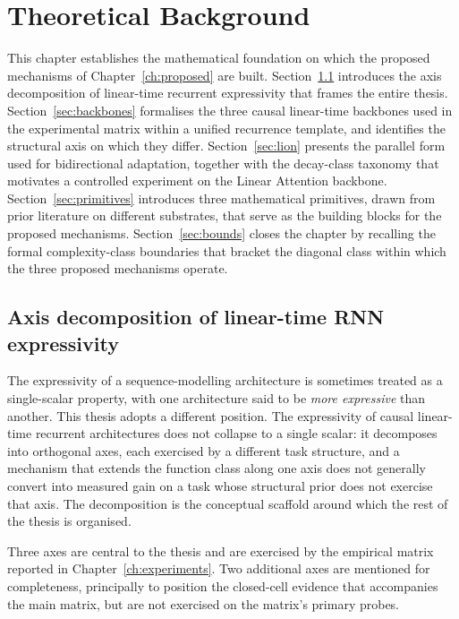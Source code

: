 \chapter{Theoretical Background}\label{ch:theoretical}

This chapter establishes the mathematical foundation on which the
proposed mechanisms of Chapter~\ref{ch:proposed} are built.
Section~\ref{sec:axes} introduces the axis decomposition of linear-time
recurrent expressivity that frames the entire thesis.
Section~\ref{sec:backbones} formalises the three causal linear-time
backbones used in the experimental matrix within a unified recurrence
template, and identifies the structural axis on which they differ.
Section~\ref{sec:lion} presents the parallel form used for
bidirectional adaptation, together with the decay-class taxonomy that
motivates a controlled experiment on the Linear Attention backbone.
Section~\ref{sec:primitives} introduces three mathematical primitives,
drawn from prior literature on different substrates, that serve as the
building blocks for the proposed mechanisms. Section~\ref{sec:bounds}
closes the chapter by recalling the formal complexity-class boundaries
that bracket the diagonal class within which the three proposed
mechanisms operate.

\section{Axis decomposition of linear-time RNN expressivity}\label{sec:axes}

The expressivity of a sequence-modelling architecture is sometimes
treated as a single-scalar property, with one architecture said to be
\textit{more expressive} than another. This thesis adopts a different
position. The expressivity of causal linear-time recurrent
architectures does not collapse to a single scalar: it decomposes
into orthogonal axes, each exercised by a different task structure,
and a mechanism that extends the function class along one axis does
not generally convert into measured gain on a task whose structural
prior does not exercise that axis. The decomposition is the
conceptual scaffold around which the rest of the thesis is organised.

Three axes are central to the thesis and are exercised by the
empirical matrix reported in Chapter~\ref{ch:experiments}. Two
additional axes are mentioned for completeness, principally to
position the closed-cell evidence that accompanies the main matrix,
but are not exercised on the matrix's primary probes.

